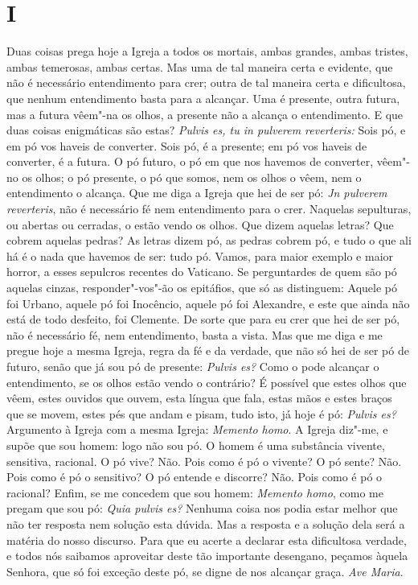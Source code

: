 \section*{I}

\noindent{}Duas coisas prega hoje a Igreja a todos os mortais, ambas grandes, ambas
tristes, ambas temerosas, ambas certas. Mas uma de tal maneira certa e
evidente, que não é necessário entendimento para crer; outra de tal
maneira certa e dificultosa, que nenhum entendimento basta para a
alcançar. Uma é presente, outra futura, mas a futura vêem"-na os olhos, a
presente não a alcança o entendimento. E que duas coisas enigmáticas são
estas? \emph{Pulvis es, tu in pulverem reverteris:} Sois pó, e em pó vos
haveis de converter. Sois pó, é a presente; em pó vos haveis de
converter, é a futura. O pó futuro, o pó em que nos havemos de
converter, vêem"-no os olhos; o pó presente, o pó que somos, nem os olhos
o vêem, nem o entendimento o alcança. Que me diga a Igreja que hei de
ser pó: \emph{Jn pulverem reverteris}, não é necessário fé nem
entendimento para o crer. Naquelas sepulturas, ou abertas ou cerradas, o
estão vendo os olhos. Que dizem aquelas letras? Que cobrem aquelas
pedras? As letras dizem pó, as pedras cobrem pó, e tudo o que ali há é o
nada que havemos de ser: tudo pó. Vamos, para maior exemplo e maior
horror, a esses sepulcros recentes do Vaticano. Se perguntardes de quem
são pó aquelas cinzas, responder"-vos"-ão os epitáfios, que só as
distinguem: Aquele pó foi Urbano, aquele pó foi Inocêncio,
aquele pó foi Alexandre, e este que ainda não está de todo desfeito, foi
Clemente. De sorte que para eu crer que hei de ser pó, não é necessário
fé, nem entendimento, basta a vista. Mas que me diga e me pregue hoje a
mesma Igreja, regra da fé e da verdade, que não só hei de ser pó de
futuro, senão que já sou pó de presente: \emph{Pulvis es?} Como o pode
alcançar o entendimento, se os olhos estão vendo o contrário? É possível
que estes olhos que vêem, estes ouvidos que ouvem, esta língua que fala,
estas mãos e estes braços que se movem, estes pés que andam e pisam,
tudo isto, já hoje é pó: \emph{Pulvis es?} Argumento à Igreja com a
mesma Igreja: \emph{Memento homo}. A Igreja diz"-me, e supõe que sou
homem: logo não sou pó. O homem é uma substância vivente, sensitiva,
racional. O pó vive? Não. Pois como é pó o vivente? O pó sente? Não.
Pois como é pó o sensitivo? O pó entende e discorre? Não. Pois como é pó
o racional? Enfim, se me concedem que sou homem: \emph{Memento homo},
como me pregam que sou pó: \emph{Quia pulvis es?} Nenhuma coisa nos
podia estar melhor que não ter resposta nem solução esta dúvida. Mas a
resposta e a solução dela será a matéria do nosso discurso. Para que eu
acerte a declarar esta dificultosa verdade, e todos nós saibamos
aproveitar deste tão importante desengano, peçamos àquela Senhora, que
só foi exceção deste pó, se digne de nos alcançar graça. \emph{Ave Maria}.


